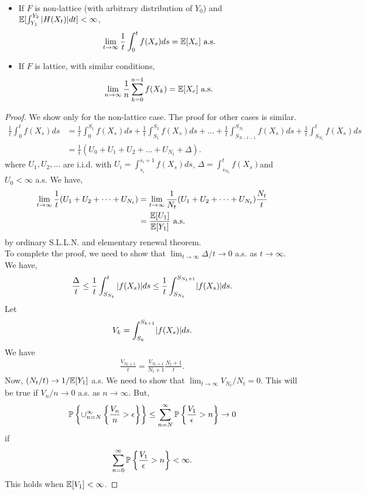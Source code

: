 \documentclass[all-lectures.tex]{subfiles}
\begin{document}
\begin{thm} \
\begin{itemize}
\item If $F$ is non-lattice (with arbitrary distribution of $Y_0$) and $\E[\int_{Y_1}^{Y_2}|H(X_t)|dt] <\infty$,
\begin{align*}
\lim_{t \to \infty} \frac{1}{t} \int_0^t f(X_s)ds = \E[X_e] \text{ a.s.}
\end{align*}
\item If $F$ is lattice, with similar conditions,
\begin{align*}
\lim_{n \to \infty} \frac{1}{n} \sum_{k=0}^{n-1} f(X_k) = \E[X_e] \text{ a.s.}
\end{align*}
\end{itemize}
\begin{proof}
We show only for the non-lattice case. The proof for other cases is similar. 
\begin{align*}
\frac{1}{t} \int_0^t f(X_s)ds &= \frac{1}{t} \int_0^{S_1} f(X_s)ds + \frac{1}{t} \int_{S_1}^{S_2} f(X_s)ds + \dots + \frac{1}{t} \int_{S_{N-t -1}}^{S_{N_t}} f(X_s)ds + \frac{1}{t} \int_{S_{N_t}}^t f(X_s)ds \\
&= \frac{1}{t} (U_0+U_1+ U_2+ \dots +U_{N_t} + \Delta).
\end{align*}
where $U_1,U_2,\dots$ are i.i.d. with $U_i = \int_{s_i}^{s_i + 1} f(X_s)ds$, $\Delta = \int_{s_{N_t}}^{t} f(X_s)$and $U_0 < \infty$ a.s. We have, 
\begin{align*}
\lim_{t \to \infty} \frac{1}{t} (U_1+ U_2+ \dots +U_{N_t} ) &= \lim_{t \to \infty} \frac{1}{N_t} (U_1+ U_2+ \dots +U_{N_t} ) \frac{N_t}{t} \\
&= \frac{\E[U_1] }{\E[Y_1]} \text{ a.s.}
\end{align*}
by ordinary S.L.L.N. and elementary renewal theorem.  \\
\indent To complete the proof, we need to show that $\lim_{t \to \infty} \Delta/t \to 0$ a.s. as $t \to \infty$. We have, 
\begin{align*}
\frac{\Delta}{t} \leq \frac{1}{t} \int_{S_{N_t}}^t |f(X_s)| ds \leq \frac{1}{t}\int_{S_{N_t}}^{S_{N_t +1}} \abs{f(X_s)} ds.
\end{align*}
Let 
\begin{align*}
V_k = \int_{S_k}^{S_{k +1}} \abs{f(X_s)} ds.
\end{align*}
We have
\begin{align*}
\frac{V_{{N_t +1}}}{t} = \frac{V_{{N_t +1}}}{N_t+1} \frac{N_t+1}{t}.
\end{align*}
Now, $(N_t/t) \to 1/\E[Y_1]$ a.s.  We need to show that $\lim_{t \to \infty} V_{N_t}/N_t = 0$. This will be true if $V_n/n \to 0$ a.s. as $n\to \infty$. But, 
\begin{align*}
\P\left\{ \cup_{n=N}^\infty \left\{\frac{V_n}{n} > \epsilon\right\}\right\} &\leq \sum_{n=N}^\infty \P\left\{\frac{V_1}{\epsilon} > n\right\} \to 0\\
\end{align*}
if 
\begin{align*}
\sum_{n=0}^\infty \P \left\{\frac{V_1}{\epsilon} > n \right\} < \infty.
\end{align*}
This holds when $\E[V_1] < \infty$.

\end{proof}
\end{thm}
\end{document}
